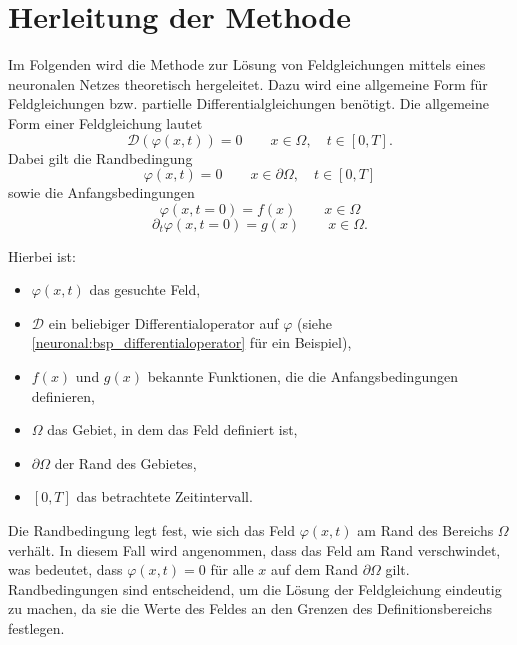 %
%
%
%

\section{Herleitung der Methode\label{neuronal:section:herleitung}}

Im Folgenden wird die Methode zur Lösung von Feldgleichungen mittels eines neuronalen Netzes theoretisch hergeleitet.
Dazu wird eine allgemeine Form für Feldgleichungen bzw. partielle Differentialgleichungen benötigt.
Die allgemeine Form einer Feldgleichung lautet
\begin{equation}
\mathcal{D}(\varphi(x, t)) = 0 \qquad x \in \Omega, \quad t \in [0,T].
\label{neuronal:generelle_feldgleichung}
\end{equation}
Dabei gilt die Randbedingung
\begin{equation}
\varphi(x, t) = 0 \qquad x \in \partial \Omega, \quad t \in [0,T]
\end{equation}
sowie die Anfangsbedingungen
\begin{equation}
\varphi(x, t = 0) = f(x) \qquad x \in \Omega 
\label{neuronal:anfangsbedingung_voll}
\end{equation}
\begin{equation}
\partial_t \varphi(x, t = 0) = g(x) \qquad x \in \Omega.
\label{neuronal:anfangsbedingung_partiel}
\end{equation}


Hierbei ist:
\begin{itemize}
    \item $\varphi(x, t)$ das gesuchte Feld,
    \item $\mathcal{D}$ ein beliebiger Differentialoperator auf $\varphi$ (siehe \eqref{neuronal:bsp_differentialoperator} für ein Beispiel),
    \item $f(x)$ und $g(x)$ bekannte Funktionen, die die Anfangsbedingungen definieren,
    \item $\Omega$ das Gebiet, in dem das Feld definiert ist,
    \item $\partial \Omega$ der Rand des Gebietes,
    \item $[0,T]$ das betrachtete Zeitintervall.
\end{itemize}

Die Randbedingung legt fest, wie sich das Feld $\varphi(x, t)$ am Rand des Bereichs $\Omega$ verhält.
In diesem Fall wird angenommen, dass das Feld am Rand verschwindet, was bedeutet, dass $\varphi(x, t) = 0$ für alle $x$ auf dem Rand $\partial \Omega$ gilt.
Randbedingungen sind entscheidend, um die Lösung der Feldgleichung eindeutig zu machen, da sie die Werte des Feldes an den Grenzen des Definitionsbereichs festlegen.


